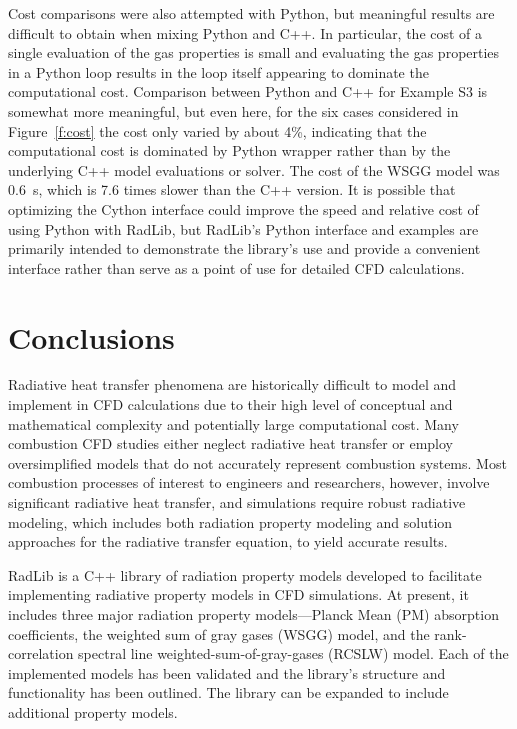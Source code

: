 \documentclass[preprint,12pt]{elsarticle}
\begin{document}
    Cost comparisons were also attempted with Python, but meaningful results are difficult to obtain when mixing Python and C++. In particular, the cost of a single evaluation of the gas properties is small and evaluating the gas properties in a Python loop results in the loop itself appearing to dominate the computational cost. Comparison between Python and C++ for Example S3 is somewhat more meaningful, but even here, for the six cases considered in Figure~\ref{f:cost} the cost only varied by about 4\%, indicating that the computational cost is dominated by Python wrapper rather than by the underlying C++ model evaluations or solver. The cost of the WSGG model was 0.6~s, which is 7.6 times slower than the C++ version. It is possible that optimizing the Cython interface could improve the speed and relative cost of using Python with RadLib, but RadLib's Python interface and examples are primarily intended to demonstrate the library's use and provide a convenient interface rather than serve as a point of use for detailed CFD calculations.



    \section{Conclusions} \label{s:conclusions}

    Radiative heat transfer phenomena are historically difficult to model and implement in CFD calculations due to
    their high level of conceptual and mathematical complexity and potentially large computational cost. Many
    combustion CFD studies either neglect radiative heat transfer or employ oversimplified models that do not
    accurately represent combustion systems. Most combustion processes of interest to engineers and researchers,
    however, involve significant radiative heat transfer, and simulations require robust radiative modeling, which
    includes both radiation property modeling and solution approaches for the radiative transfer equation, to yield
    accurate results.

    RadLib is a C++ library of radiation property models developed to facilitate implementing radiative property
    models in CFD simulations. At present, it includes three major radiation property models---Planck Mean (PM)
    absorption coefficients, the weighted sum of gray gases (WSGG) model, and the rank-correlation spectral line
    weighted-sum-of-gray-gases (RCSLW) model. Each of the implemented models has been validated and the library's
    structure and functionality has been outlined. The library can be expanded to include additional property models.
\end{document}

